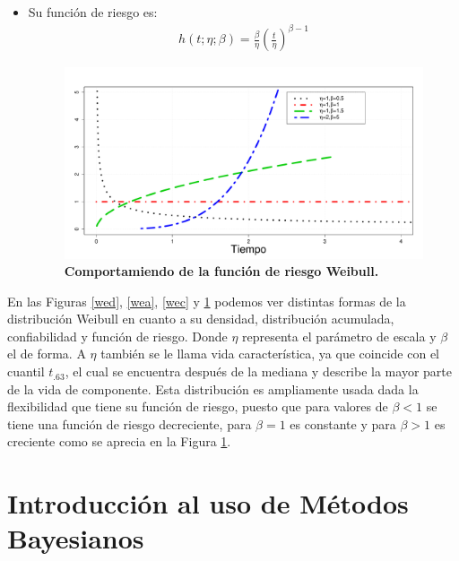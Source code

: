 \begin{itemize}
\item Su funci\'on de riesgo es:
\begin{eqnarray*}
h(t;\eta;\beta)=\frac{\beta}{\eta}\left(\frac{t}{\eta}\right)^{\beta-1}
\end{eqnarray*}


\begin{figure}
\begin{center}
\includegraphics[scale=0.35]{weR.pdf}
\end{center}
\vspace{-1cm}\caption{\bf Comportamiendo de la funci\'on de riesgo Weibull.}\label{wer}
\end{figure}
\end{itemize}

\noindent En las Figuras \ref{wed},  \ref{wea},  \ref{wec} y  \ref{wer} podemos ver distintas formas de la distribuci\'on Weibull en cuanto a su densidad, distribuci\'on acumulada, confiabilidad y funci\'on de riesgo.
Donde $\eta$  representa el par\'ametro de escala y $\beta$ el de forma. A $\eta$ tambi\'en se le llama vida caracter\'istica, ya que coincide con el cuantil $t_{.63}$, el cual se encuentra despu\'es de la mediana y  describe la mayor parte de la vida de componente. Esta distribuci\'on es ampliamente usada dada la flexibilidad que tiene su funci\'on de riesgo, puesto que para valores de $\beta<1$ se tiene una funci\'on de riesgo decreciente, para $\beta=1$ es constante y para $\beta>1$ es creciente como se aprecia en la  Figura \ref{wer}. 


\section{Introducci\'on al uso de M\'etodos Bayesianos}

